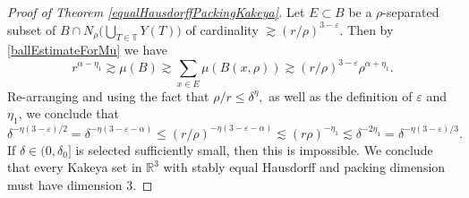 \documentclass[letterpaper, reqno,11pt]{article}
\numberwithin{equation}{section}
\newcommand{\RR}{\mathbb{R}}
\newcommand{\eps}{\varepsilon}
\newcommand{\tubes}{\mathbb{T}}
\numberwithin{thm}{section}
\theoremstyle{remark}
\begin{document}
\begin{proof}[Proof of Theorem \ref{equalHausdorffPackingKakeya}]
Let $E\subset B$ be a $\rho$-separated subset of $B \cap N_{\rho}\Big(\bigcup_{T\in\tubes}Y(T)\Big)$ of cardinality $\gtrsim (r/\rho)^{3-\eps}$. Then by \eqref{ballEstimateForMu} we have 
\[
r^{\alpha-\eta_1}\gtrsim \mu(B) \gtrsim \sum_{x\in E}\mu(B(x,\rho))\gtrsim (r/\rho)^{3-\eps} \rho^{\alpha+\eta_1}.
\]
Re-arranging and using the fact that $\rho/r \leq\delta^\eta,$ as well as the definition of $\eps$ and $\eta_1$, we conclude that
\[
\delta^{-\eta(3-\eps)/2}= \delta^{-\eta(3-\eps-\alpha)} \leq (r/\rho)^{-\eta(3-\eps-\alpha)}\lesssim (r\rho)^{-\eta_1}\lesssim\delta^{-2\eta_1}=\delta^{-\eta(3-\eps)/3}.
\]
If $\delta\in(0,\delta_0]$ is selected sufficiently small, then this is impossible. We conclude that every Kakeya set in $\RR^3$ with stably equal Hausdorff and packing dimension must have dimension 3.
\end{proof}
\end{document}
